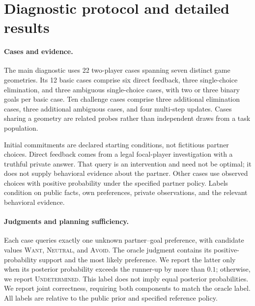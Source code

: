 \section{Diagnostic protocol and detailed results}
\label{app:diagnose}

\paragraph{Cases and evidence.}
The main diagnostic uses 22 two-player cases spanning
seven distinct game geometries. Its 12 basic cases comprise six direct
feedback, three single-choice elimination, and three ambiguous single-choice
cases, with two or three binary goals per basic case. Ten challenge cases
comprise three additional elimination cases, three additional ambiguous
cases, and four multi-step updates. Cases sharing a geometry are related
probes rather than independent draws from a task population.

Initial commitments are declared starting conditions, not fictitious partner
choices. Direct feedback comes from a legal focal-player investigation with
a truthful private answer. That query is an intervention and need not be
optimal; it does not supply behavioral evidence about the partner. Other
cases use observed choices with positive probability under the specified
partner policy. Labels condition on public facts, own preferences, private
observations, and the relevant behavioral evidence.

\paragraph{Judgments and planning sufficiency.}
Each case queries exactly one unknown partner--goal preference, with
candidate values \textsc{Want}, \textsc{Neutral}, and \textsc{Avoid}.
The oracle judgment contains its positive-probability support and the most
likely preference. We report the latter only when its posterior probability
exceeds the runner-up by more than $0.1$; otherwise, we report
\textsc{Undetermined}. This label does not imply equal posterior probabilities.
We report joint correctness,
requiring both components to match the oracle label. All labels are relative to the public
prior and specified reference policy.


